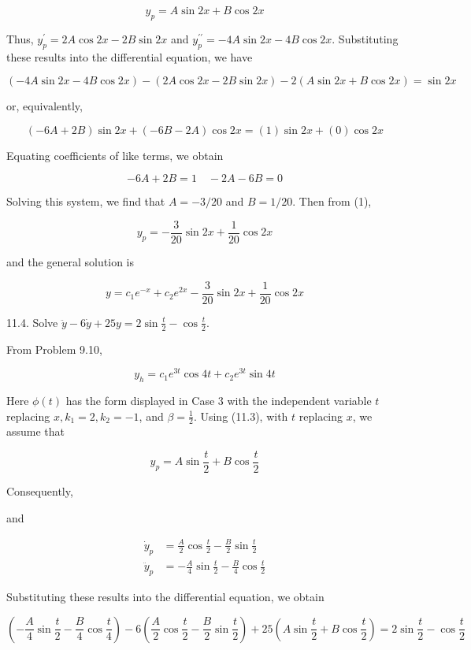\documentclass[10pt]{article}
\begin{document}
\begin{equation*}
y_{p}=A \sin 2 x+B \cos 2 x \tag{1}
\end{equation*}


Thus, $y_{p}^{\prime}=2 A \cos 2 x-2 B \sin 2 x$ and $y_{p}^{\prime \prime}=-4 A \sin 2 x-4 B \cos 2 x$. Substituting these results into the differential equation, we have

$$
(-4 A \sin 2 x-4 B \cos 2 x)-(2 A \cos 2 x-2 B \sin 2 x)-2(A \sin 2 x+B \cos 2 x)=\sin 2 x
$$

or, equivalently,

$$
(-6 A+2 B) \sin 2 x+(-6 B-2 A) \cos 2 x=(1) \sin 2 x+(0) \cos 2 x
$$

Equating coefficients of like terms, we obtain

$$
-6 A+2 B=1 \quad-2 A-6 B=0
$$

Solving this system, we find that $A=-3 / 20$ and $B=1 / 20$. Then from (1),

$$
y_{p}=-\frac{3}{20} \sin 2 x+\frac{1}{20} \cos 2 x
$$

and the general solution is

$$
y=c_{1} e^{-x}+c_{2} e^{2 x}-\frac{3}{20} \sin 2 x+\frac{1}{20} \cos 2 x
$$

11.4. Solve $\ddot{y}-6 \dot{y}+25 y=2 \sin \frac{t}{2}-\cos \frac{t}{2}$.

From Problem 9.10,

$$
y_{h}=c_{1} e^{3 t} \cos 4 t+c_{2} e^{3 t} \sin 4 t
$$

Here $\phi(t)$ has the form displayed in Case 3 with the independent variable $t$ replacing $x, k_{1}=2, k_{2}=-1$, and $\beta=\frac{1}{2}$. Using (11.3), with $t$ replacing $x$, we assume that


\begin{equation*}
y_{p}=A \sin \frac{t}{2}+B \cos \frac{t}{2} \tag{1}
\end{equation*}


Consequently,

and

$$
\begin{aligned}
\dot{y}_{p} & =\frac{A}{2} \cos \frac{t}{2}-\frac{B}{2} \sin \frac{t}{2} \\
\ddot{y}_{p} & =-\frac{A}{4} \sin \frac{t}{2}-\frac{B}{4} \cos \frac{t}{2}
\end{aligned}
$$

Substituting these results into the differential equation, we obtain

$$
\left(-\frac{A}{4} \sin \frac{t}{2}-\frac{B}{4} \cos \frac{t}{4}\right)-6\left(\frac{A}{2} \cos \frac{t}{2}-\frac{B}{2} \sin \frac{t}{2}\right)+25\left(A \sin \frac{t}{2}+B \cos \frac{t}{2}\right)=2 \sin \frac{t}{2}-\cos \frac{t}{2}
$$
\end{document}
